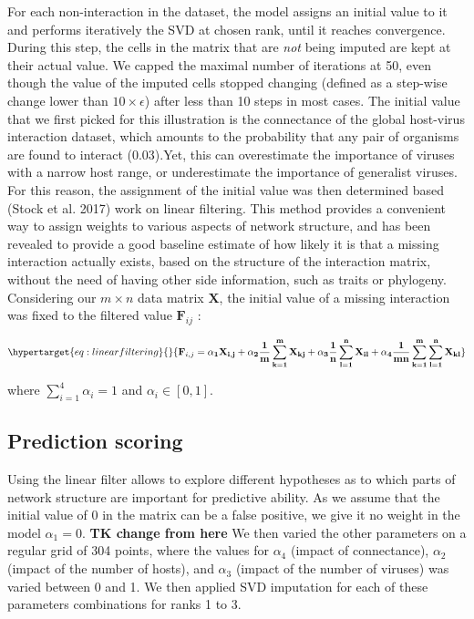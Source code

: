 \documentclass[10pt,oneside]{article}
\begin{document}
For each non-interaction in the dataset, the model assigns an initial
value to it and performs iteratively the SVD at chosen rank, until it
reaches convergence. During this step, the cells in the matrix that are
\emph{not} being imputed are kept at their actual value. We capped the
maximal number of iterations at 50, even though the value of the imputed
cells stopped changing (defined as a step-wise change lower than
\(10\times \epsilon\)) after less than 10 steps in most cases. The
initial value that we first picked for this illustration is the
connectance of the global host-virus interaction dataset, which amounts
to the probability that any pair of organisms are found to interact
(0.03).Yet, this can overestimate the importance of viruses with a
narrow host range, or underestimate the importance of generalist
viruses. For this reason, the assignment of the initial value was then
determined based (Stock et al. 2017) work on linear filtering. This
method provides a convenient way to assign weights to various aspects of
network structure, and has been revealed to provide a good baseline
estimate of how likely it is that a missing interaction actually exists,
based on the structure of the interaction matrix, without the need of
having other side information, such as traits or phylogeny. Considering
our \(m \times n\) data matrix \(\mathbf{X}\), the initial value of a
missing interaction was fixed to the filtered value \(\mathbf{F}_{ij}\)
:

\begin{equation}\protect\hypertarget{eq:linearfiltering}{}{\mathbf{F}_{i,j} =  \mathbf{\alpha_{1}X_{i,j}+\alpha_{2}\frac{1}{m}\sum_{k=1}^m X_{kj} + \alpha_{3}\frac{1}{n}\sum_{l=1}^n X_{il} + \alpha_{4}\frac{1}{mn}\sum_{k=1}^m\sum_{l=1}^n X_{kl} }}\label{eq:linearfiltering}\end{equation}

where \(\sum\limits_{i=1}^4 \alpha_{i} = 1\) and
\(\alpha_{i} \in [0,1]\).

\hypertarget{prediction-scoring}{%
\subsection{Prediction scoring}\label{prediction-scoring}}

Using the linear filter allows to explore different hypotheses as to
which parts of network structure are important for predictive ability.
As we assume that the initial value of 0 in the matrix can be a false
positive, we give it no weight in the model \(\alpha_1 = 0\). \textbf{TK
change from here} We then varied the other parameters on a regular grid
of 304 points, where the values for \(\alpha_4\) (impact of
connectance), \(\alpha_2\) (impact of the number of hosts), and
\(\alpha_3\) (impact of the number of viruses) was varied between 0 and
1. We then applied SVD imputation for each of these parameters
combinations for ranks 1 to 3.
\end{document}
